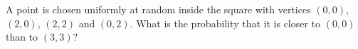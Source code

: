 A point is chosen uniformly at random inside the square with vertices $(0,0)$, $(2,0)$, $(2,2)$ and $(0,2)$. What is the probability that it is closer to $(0,0)$ than to $(3,3)$?
